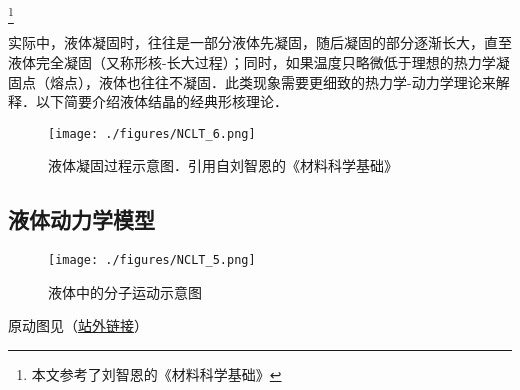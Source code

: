 \footnote{本文参考了刘智恩的《材料科学基础》}

\begin{issues}
\issueDraft
{}
\end{issues}

实际中，液体凝固时，往往是一部分液体先凝固，随后凝固的部分逐渐长大，直至液体完全凝固（又称形核-长大过程）；同时，如果温度只略微低于理想的热力学凝固点（熔点），液体也往往不凝固．此类现象需要更细致的热力学-动力学理论来解释．以下简要介绍液体结晶的经典形核理论．

\begin{figure}[ht]
\centering
\texttt{[image: ./figures/NCLT\_6.png]}
\caption{液体凝固过程示意图．引用自刘智恩的《材料科学基础》} \label{NCLT_fig6}
\end{figure}

\subsection{液体动力学模型}
\begin{figure}[ht]
\centering
\texttt{[image: ./figures/NCLT\_5.png]}
\caption{液体中的分子运动示意图} \label{NCLT_fig5}
\end{figure}

原动图见（\href{https://chem.libretexts.org/Bookshelves/General_Chemistry/Map%3A_A_Molecular_Approach_(Tro)/11%3A_Liquids_Solids_and_Intermolecular_Forces/11.02%3A_Solids_Liquids_and_Gases-_A_Molecular_Comparison}{站外链接}）



